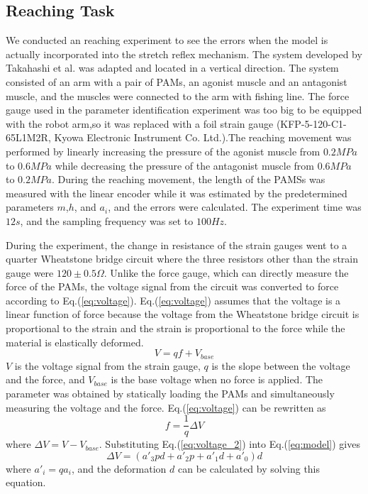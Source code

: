 \subsection{Reaching Task}
We conducted an reaching experiment to see the errors when the model is actually incorporated into the stretch reflex mechanism. The system developed by Takahashi et al.\cite{takahashi} was adapted and located in a vertical direction. The system consisted of an arm with a pair of PAMs, an agonist muscle and an antagonist muscle, and the muscles were connected to the arm with fishing line. The force gauge used in the parameter identification experiment was too big to be equipped with the robot arm,so it was replaced with a foil strain gauge (KFP-5-120-C1-65L1M2R, Kyowa Electronic Instrument Co. Ltd.).The reaching movement was performed by linearly increasing the pressure of the agonist muscle from $0.2 \si{MPa}$ to $0.6 \si{MPa}$ while decreasing the pressure of the antagonist muscle from $0.6 \si{MPa}$ to $0.2 \si{MPa}$. During the reaching movement, the length of the PAMSs was measured with the linear encoder while it was estimated by the predetermined parameters $m$,$h$, and $a_i$, and the errors were calculated. The experiment time was $12 \si{s}$, and the sampling frequency was set to $100 \si{Hz}$.

During the experiment, the change in resistance of the strain gauges went to a quarter Wheatstone bridge circuit where the three resistors other than the strain gauge were $120 \pm 0.5 \Omega$. Unlike the force gauge, which can directly measure the force of the PAMs, the voltage signal from the circuit was converted to force according to Eq.(\ref{eq:voltage}). Eq.(\ref{eq:voltage}) assumes that the voltage is a linear function of force because the voltage from the Wheatstone bridge circuit is proportional to the strain\cite{wheatstone} and the strain is proportional to the force while the material is elastically deformed.
\begin{equation}
    \label{eq:voltage}
    V=qf+V_{base}
\end{equation}
$V$ is the voltage signal from the strain gauge, $q$ is the slope between the voltage and the force, and $V_{base}$ is the base voltage when no force is applied.
The parameter was obtained by statically loading the PAMs and simultaneously measuring the voltage and the force.
Eq.(\ref{eq:voltage}) can be rewritten as 
\begin{equation}
    \label{eq:voltage_2}
    f = \frac{1}{q}\Delta V
\end{equation}
where $\Delta V = V - V_{base}$. Substituting Eq.(\ref{eq:voltage_2}) into Eq.(\ref{eq:model}) gives
\begin{equation}
    \label{eq:model_voltage}
    \Delta V = (a'_3pd + a'_2p + a'_1d + a'_0)d
\end{equation}
where $a'_i=qa_i$, and the deformation $d$ can be calculated by solving this equation.

